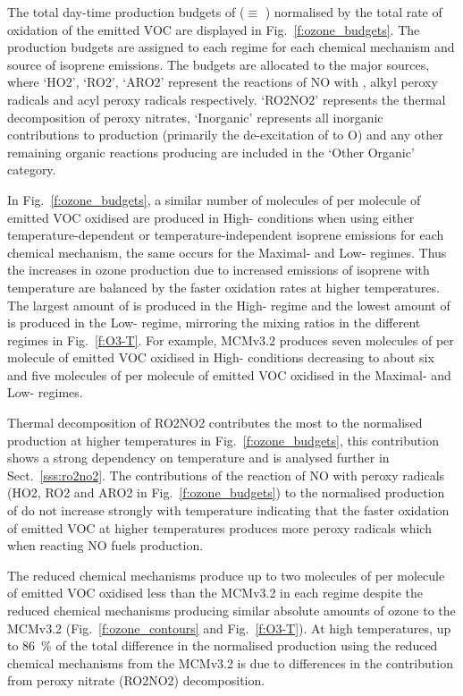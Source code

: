 The total day-time production budgets of  ($\equiv$ ) normalised by the total rate of oxidation of the emitted VOC are displayed in Fig.~\ref{f:ozone_budgets}.
The  production budgets are assigned to each  regime for each chemical mechanism and source of isoprene emissions.
The budgets are allocated to the major sources, where `HO2', `RO2', `ARO2' represent the reactions of NO with , alkyl peroxy radicals and acyl peroxy radicals respectively.
`RO2NO2' represents the thermal decomposition of peroxy nitrates, `Inorganic' represents all inorganic contributions to  production (primarily the de-excitation of  to O) and any other remaining organic reactions producing  are included in the `Other Organic' category.

In Fig.~\ref{f:ozone_budgets}, a similar number of molecules of  per molecule of emitted VOC oxidised are produced in High- conditions when using either temperature-dependent or temperature-independent isoprene emissions for each chemical mechanism, the same occurs for the Maximal- and Low- regimes.
Thus the increases in ozone production due to increased emissions of isoprene with temperature are balanced by the faster oxidation rates at higher temperatures.
The largest amount of  is produced in the High- regime and the lowest amount of  is produced in the Low- regime, mirroring the  mixing ratios in the different  regimes in Fig.~\ref{f:O3-T}.
For example, MCMv3.2 produces seven molecules of  per molecule of emitted VOC oxidised in High- conditions decreasing to about six and five molecules of  per molecule of emitted VOC oxidised in the Maximal- and Low- regimes.

Thermal decomposition of RO2NO2 contributes the most to the normalised  production at higher temperatures in Fig.~\ref{f:ozone_budgets}, this contribution shows a strong dependency on temperature and is analysed further in Sect.~\ref{sss:ro2no2}.
The contributions of the reaction of NO with peroxy radicals (HO2, RO2 and ARO2 in Fig.~\ref{f:ozone_budgets}) to the normalised production of  do not increase strongly with temperature indicating that the faster oxidation of emitted VOC at higher temperatures produces more peroxy radicals which when reacting NO fuels  production.

The reduced chemical mechanisms produce up to two molecules of  per molecule of emitted VOC oxidised less than the MCMv3.2 in each  regime despite the reduced chemical mechanisms producing similar absolute amounts of ozone to the MCMv3.2 (Fig.~\ref{f:ozone_contours} and Fig.~\ref{f:O3-T}).
At high temperatures, up to $86$~\% of the total difference in the normalised  production using the reduced chemical mechanisms from the MCMv3.2 is due to differences in the contribution from peroxy nitrate (RO2NO2) decomposition.

